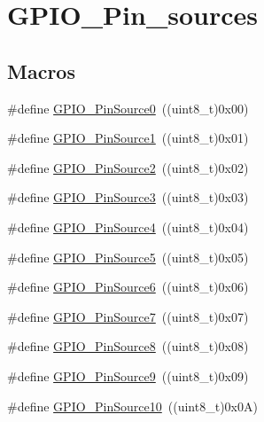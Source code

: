 \hypertarget{group___g_p_i_o___pin__sources}{}\section{G\+P\+I\+O\+\_\+\+Pin\+\_\+sources}
\label{group___g_p_i_o___pin__sources}
\subsection*{Macros}
\begin{DoxyCompactItemize}
\item 
\#define \mbox{\hyperlink{group___g_p_i_o___pin__sources_ga028bcbdf5a7fd81ec45830f60a022bb4}{G\+P\+I\+O\+\_\+\+Pin\+Source0}}~((uint8\+\_\+t)0x00)
\item 
\#define \mbox{\hyperlink{group___g_p_i_o___pin__sources_gad02324cdd8526a7aacd15a5a910d56f1}{G\+P\+I\+O\+\_\+\+Pin\+Source1}}~((uint8\+\_\+t)0x01)
\item 
\#define \mbox{\hyperlink{group___g_p_i_o___pin__sources_ga7808fb6269890fa1e37a322418884607}{G\+P\+I\+O\+\_\+\+Pin\+Source2}}~((uint8\+\_\+t)0x02)
\item 
\#define \mbox{\hyperlink{group___g_p_i_o___pin__sources_ga0df17fee84ec9ab096b5525a06871863}{G\+P\+I\+O\+\_\+\+Pin\+Source3}}~((uint8\+\_\+t)0x03)
\item 
\#define \mbox{\hyperlink{group___g_p_i_o___pin__sources_gaf5aa545455dacbf315a40cecd0842b6c}{G\+P\+I\+O\+\_\+\+Pin\+Source4}}~((uint8\+\_\+t)0x04)
\item 
\#define \mbox{\hyperlink{group___g_p_i_o___pin__sources_gaf231e680fe2db4ea44a7fd0f5d5c5875}{G\+P\+I\+O\+\_\+\+Pin\+Source5}}~((uint8\+\_\+t)0x05)
\item 
\#define \mbox{\hyperlink{group___g_p_i_o___pin__sources_gada41b6bd03b2873a2400628df0a1026e}{G\+P\+I\+O\+\_\+\+Pin\+Source6}}~((uint8\+\_\+t)0x06)
\item 
\#define \mbox{\hyperlink{group___g_p_i_o___pin__sources_ga609974472a3a7c5274fc56018d7adf16}{G\+P\+I\+O\+\_\+\+Pin\+Source7}}~((uint8\+\_\+t)0x07)
\item 
\#define \mbox{\hyperlink{group___g_p_i_o___pin__sources_ga6f5962c5b2ce5734734563bdad18fbd6}{G\+P\+I\+O\+\_\+\+Pin\+Source8}}~((uint8\+\_\+t)0x08)
\item 
\#define \mbox{\hyperlink{group___g_p_i_o___pin__sources_gabaaed5961f2b9862082f74e18f5c3f0e}{G\+P\+I\+O\+\_\+\+Pin\+Source9}}~((uint8\+\_\+t)0x09)
\item 
\#define \mbox{\hyperlink{group___g_p_i_o___pin__sources_gacec97d9c2d319b450f699adff6430c86}{G\+P\+I\+O\+\_\+\+Pin\+Source10}}~((uint8\+\_\+t)0x0\+A)

\end{DoxyCompactItemize}
